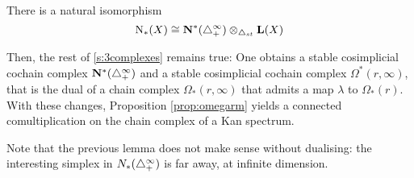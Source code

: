 \begin{lemma}
    There is a natural isomorphism
\[
    \operatorname{N}_*(X)\cong \mathbf{N}^*(\triangle_{+}^{\infty})\otimes_{\triangle_{st}} \operatorname{\mathbf{L}}(X)
\]
\end{lemma}

Then, the rest of \cref{s:3complexes} remains true: One obtains a stable cosimplicial cochain complex $\mathbf{N}^*(\triangle_{+}^\infty)$ and a stable cosimplicial cochain complex $\Omega^*(r,\infty)$, that is the dual of a chain complex $\Omega_*(r,\infty)$ that admits a map $\lambda$ to $\Omega_*(r)$. With these changes, Proposition \ref{prop:omegarm} yields a connected comultiplication on the chain complex of a Kan spectrum.

Note that the previous lemma does not make sense without dualising: the interesting simplex in $N_*(\triangle_{+}^\infty)$ is far away, at infinite dimension.


